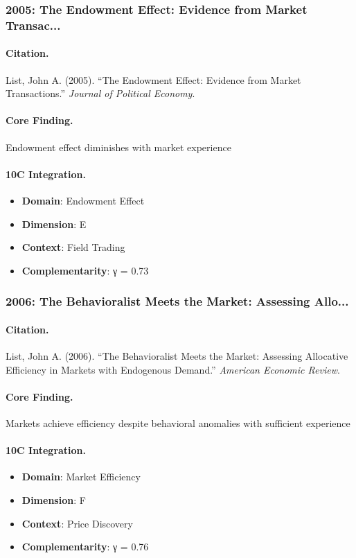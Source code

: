 \subsubsection{2005: The Endowment Effect: Evidence from Market Transac...}

\paragraph{Citation.}
List, John A. (2005). ``The Endowment Effect: Evidence from Market Transactions.''
\textit{Journal of Political Economy}.

\paragraph{Core Finding.}
Endowment effect diminishes with market experience

\paragraph{10C Integration.}
\begin{itemize}[nosep]
  \item \textbf{Domain}: Endowment Effect
  \item \textbf{Dimension}: E
  \item \textbf{Context}: Field Trading
  \item \textbf{Complementarity}: γ = 0.73
\end{itemize}


\subsubsection{2006: The Behavioralist Meets the Market: Assessing Allo...}

\paragraph{Citation.}
List, John A. (2006). ``The Behavioralist Meets the Market: Assessing Allocative Efficiency in Markets with Endogenous Demand.''
\textit{American Economic Review}.

\paragraph{Core Finding.}
Markets achieve efficiency despite behavioral anomalies with sufficient experience

\paragraph{10C Integration.}
\begin{itemize}[nosep]
  \item \textbf{Domain}: Market Efficiency
  \item \textbf{Dimension}: F
  \item \textbf{Context}: Price Discovery
  \item \textbf{Complementarity}: γ = 0.76
\end{itemize}


